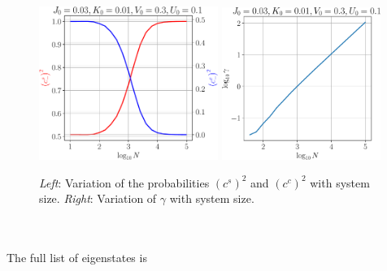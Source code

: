 \documentclass[twoside,11pt]{report}
\numberwithin{equation}{section}
\begin{document}
\begin{figure}[htbp]
	\centering
	\includegraphics[width=0.52\textwidth]{../figures/cscc_q1.pdf}
	\includegraphics[width=0.46\textwidth]{../figures/gamma_q1.pdf}
	\caption{\textit{Left}: Variation of the probabilities \(\left(c^s\right)^2\) and \(\left(c^c\right)^2\) with system size. \textit{Right}: Variation of \(\gamma\) with system size.}
	\label{gamma}
\end{figure}
\\\\The full list of eigenstates is
\end{document}
